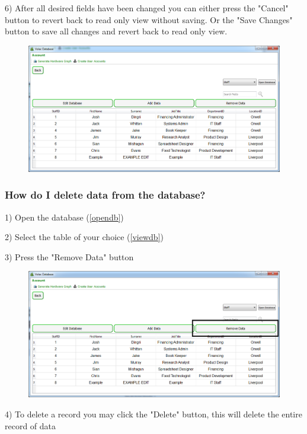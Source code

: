 6) After all desired fields have been changed you can either press the "Cancel" button to revert back to read only view without saving. Or the "Save Changes" button to save all changes and revert back to read only view.

\begin{figure}[H]
    \includegraphics[width=\textwidth]{./Manual/Images/editdata3.png}
\end{figure}

\subsubsection{How do I delete data from the database?}\label{deletedata}

1) Open the database (\ref{opendb})

2) Select the table of your choice (\ref{viewdb})

3) Press the "Remove Data" button

\begin{figure}[H]
    \includegraphics[width=\textwidth]{./Manual/Images/deletedata.png}
\end{figure}

4) To delete a record you may click the "Delete" button, this will delete the entire record of data

